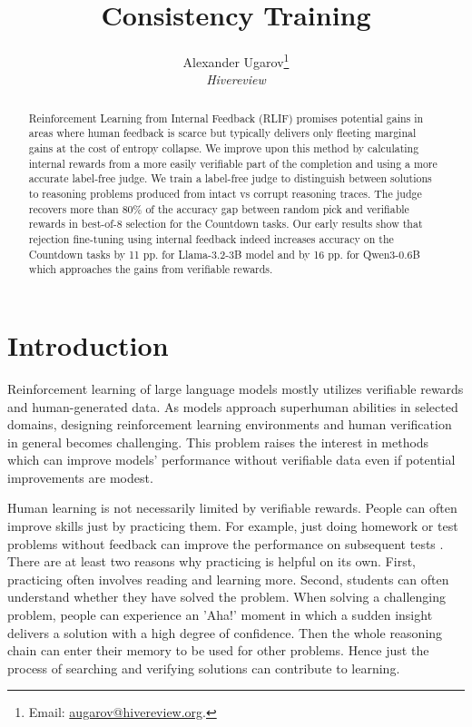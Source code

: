 \documentclass[12pt,a4paper]{article}
\title{\Large Consistency Training\\}
\author{Alexander Ugarov\thanks{Email: \href{mailto:augarov@hivereview.org}{augarov@hivereview.org}.} \\
{\small \textit{Hivereview}}
}
\begin{document}
\maketitle
\onehalfspacing
\begin{abstract}
\noindent 
Reinforcement Learning from Internal Feedback (RLIF) promises potential gains in areas where human feedback is scarce but typically delivers only fleeting marginal gains at the cost of entropy collapse. We improve upon this method by calculating internal rewards from a more easily verifiable part of the completion and using a more accurate label-free judge. We train a label-free judge to distinguish between solutions to reasoning problems produced from intact vs corrupt reasoning traces. The judge recovers more than 80\% of the accuracy gap between random pick and verifiable rewards in best-of-8 selection for the Countdown tasks. Our early results show that rejection fine-tuning using internal feedback indeed increases accuracy on the Countdown tasks by 11 pp. for Llama-3.2-3B model and by 16 pp. for Qwen3-0.6B which approaches the gains from verifiable rewards.


\vspace{6pt}
\end{abstract}
\normalsize

\section{Introduction}
\label{sec:intro}
Reinforcement learning of large language models mostly utilizes verifiable rewards and human-generated data. As models approach superhuman abilities in selected domains, designing reinforcement learning environments and human verification in general becomes challenging. This problem raises the interest in methods which can improve models’ performance without verifiable data even if potential improvements are modest.

Human learning is not necessarily limited by verifiable rewards. People can often improve skills just by practicing them. For example, just doing homework or test problems without feedback can improve the performance on subsequent tests \citep{fyfe_mathematics_2017, avvisati_learning_2020}. There are at least two reasons why practicing is helpful on its own. First, practicing often involves reading and learning more. Second, students can often understand whether they have solved the problem. When solving a challenging problem, people can experience an 'Aha!' moment in which a sudden insight delivers a solution with a high degree of confidence. Then the whole reasoning chain can enter their memory to be used for other problems. Hence just the process of searching and verifying solutions can contribute to learning.
\end{document}
